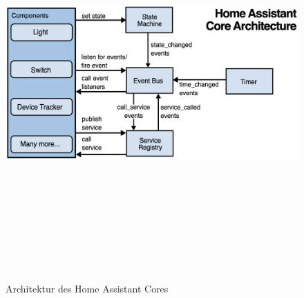     \begin{figure}[hbt!]
        \centering
        \includegraphics[width=15cm,height=15cm,keepaspectratio]{images/HAOS_Core_Architecture.png}
        \caption{Architektur des Home Assistant Cores \cite{HAOSarchitecture2018}}
        \label{fig:architectureHAOSCore}
    \end{figure}

